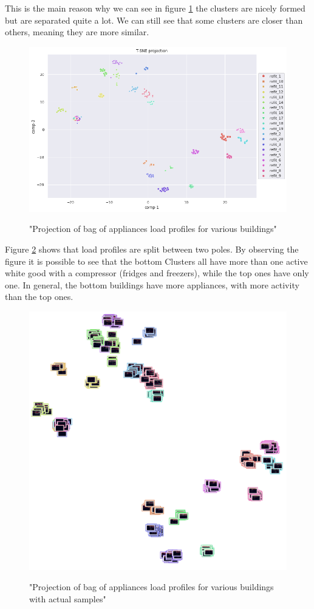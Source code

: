 This is the main reason why we can see in figure \ref{fig:tsne_boa_scatter_refit8} the clusters are nicely formed
but are separated quite a lot. We can still see that some clusters are closer than others,
meaning they are more similar.

\begin{figure}[H]
	\centering
	\caption{"Projection of bag of appliances load profiles for various buildings"}
	\includegraphics[width=.8\textwidth]{Figures/TSNE/TSNE_BOA/refit/scatter_refit_all.png}
	\label{fig:tsne_boa_scatter_refit8}
\end{figure}

Figure \ref{fig:tsne_boa_img_scatter_refit8} shows that load profiles are split 
between two poles. By observing the figure it is possible to see that the bottom Clusters
all have more than one active white good with a compressor (fridges and freezers), while
the top ones have only one. In general, the bottom buildings have more appliances,
with more activity than the top ones. 

\begin{figure}[H]
	\centering
	\caption{"Projection of bag of appliances load profiles for various buildings with actual samples"}
	\includegraphics[width=.9\textwidth]{Figures/TSNE/TSNE_BOA/refit/img_scatter_refitall.png}
	\label{fig:tsne_boa_img_scatter_refit8}
\end{figure}

